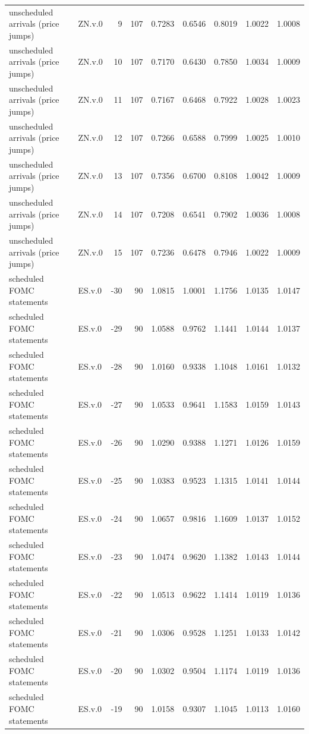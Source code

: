 \begin{tabular}{llrrrrrrr}
unscheduled arrivals (price jumps) & ZN.v.0 & 9 & 107 & 0.7283 & 0.6546 & 0.8019 & 1.0022 & 1.0008 \\
unscheduled arrivals (price jumps) & ZN.v.0 & 10 & 107 & 0.7170 & 0.6430 & 0.7850 & 1.0034 & 1.0009 \\
unscheduled arrivals (price jumps) & ZN.v.0 & 11 & 107 & 0.7167 & 0.6468 & 0.7922 & 1.0028 & 1.0023 \\
unscheduled arrivals (price jumps) & ZN.v.0 & 12 & 107 & 0.7266 & 0.6588 & 0.7999 & 1.0025 & 1.0010 \\
unscheduled arrivals (price jumps) & ZN.v.0 & 13 & 107 & 0.7356 & 0.6700 & 0.8108 & 1.0042 & 1.0009 \\
unscheduled arrivals (price jumps) & ZN.v.0 & 14 & 107 & 0.7208 & 0.6541 & 0.7902 & 1.0036 & 1.0008 \\
unscheduled arrivals (price jumps) & ZN.v.0 & 15 & 107 & 0.7236 & 0.6478 & 0.7946 & 1.0022 & 1.0009 \\
scheduled FOMC statements & ES.v.0 & -30 & 90 & 1.0815 & 1.0001 & 1.1756 & 1.0135 & 1.0147 \\
scheduled FOMC statements & ES.v.0 & -29 & 90 & 1.0588 & 0.9762 & 1.1441 & 1.0144 & 1.0137 \\
scheduled FOMC statements & ES.v.0 & -28 & 90 & 1.0160 & 0.9338 & 1.1048 & 1.0161 & 1.0132 \\
scheduled FOMC statements & ES.v.0 & -27 & 90 & 1.0533 & 0.9641 & 1.1583 & 1.0159 & 1.0143 \\
scheduled FOMC statements & ES.v.0 & -26 & 90 & 1.0290 & 0.9388 & 1.1271 & 1.0126 & 1.0159 \\
scheduled FOMC statements & ES.v.0 & -25 & 90 & 1.0383 & 0.9523 & 1.1315 & 1.0141 & 1.0144 \\
scheduled FOMC statements & ES.v.0 & -24 & 90 & 1.0657 & 0.9816 & 1.1609 & 1.0137 & 1.0152 \\
scheduled FOMC statements & ES.v.0 & -23 & 90 & 1.0474 & 0.9620 & 1.1382 & 1.0143 & 1.0144 \\
scheduled FOMC statements & ES.v.0 & -22 & 90 & 1.0513 & 0.9622 & 1.1414 & 1.0119 & 1.0136 \\
scheduled FOMC statements & ES.v.0 & -21 & 90 & 1.0306 & 0.9528 & 1.1251 & 1.0133 & 1.0142 \\
scheduled FOMC statements & ES.v.0 & -20 & 90 & 1.0302 & 0.9504 & 1.1174 & 1.0119 & 1.0136 \\
scheduled FOMC statements & ES.v.0 & -19 & 90 & 1.0158 & 0.9307 & 1.1045 & 1.0113 & 1.0160 \\

\end{tabular}
